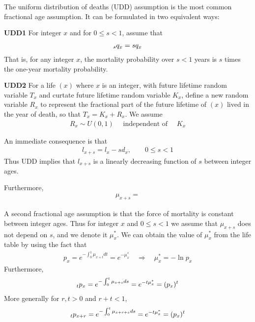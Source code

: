 \documentclass[hidelinks, 12pt]{article}
\theoremstyle{mydefstyle}
\theoremstyle{mythmstyle}
\begin{document}
The uniform distribution of deaths (UDD) assumption is the most common fractional age assumption. It can be formulated in two equivalent ways:

\textbf{UDD1} For integer $x$ and for $0 \le s < 1$, assume that
\begin{gather*}
\hspace{0mm}_sq_x = sq_x
\end{gather*}
That is, for any integer $x$, the mortality probability over $s < 1$ years is $s$ times the one-year mortality probability.

\textbf{UDD2} For a life $(x)$ where $x$ is an integer, with future lifetime random variable $T_x$ and curtate future lifetime random variable $K_x$, define a new random variable $R_x$ to represent the fractional part of the future lifetime of $(x)$ lived in the year of death, so that $T_x = K_x + R_x$. We assume
\begin{gather*}
R_x \sim U(0, 1) \quad\mbox{ independent of }\quad K_x
\end{gather*}

An immediate consequence is that 
\begin{gather*}
l_{x+s} = l_x - sd_x, \qquad 0 \le s < 1
\end{gather*}
Thus UDD implies that $l_{x+s}$ is a linearly decreasing function of $s$ between integer ages. 

\color{red}
Furthermore,
\begin{gather*}
\mu_{x+s} = 
\end{gather*}
\color{black}

A second fractional age assumption is that the force of mortality is constant between integer ages. Thus for integer $x$ and $0 \le s < 1$ we assume that $\mu_{x+s}$ does not depend on $s$, and we denote it $\mu_x^*$. We can obtain the value of $\mu_x^*$ from the life table by using the fact that
\begin{gather*}
p_x = e^{-\int_0^1 \mu_{x+t} dt} = e^{-\mu_x^*} \quad\Rightarrow\quad \mu_x^* = -\ln p_x
\end{gather*}
Furthermore, 
\begin{gather*}
\hspace{0mm}_tp_x = e^{-\int_0^t \mu_{x+s} ds} = e^{-t\mu_x^*} = (p_x)^t
\end{gather*}
More generally for $r, t > 0$ and $r + t < 1$, 
\begin{gather*}
\hspace{0mm}_tp_{x+r} = e^{-\int_0^t \mu_{x+r+s} ds} = e^{-t\mu_x^*} = (p_x)^t
\end{gather*}
\end{document}
